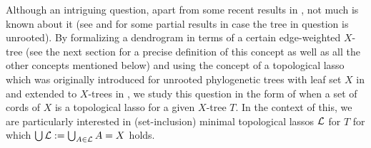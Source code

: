 Although an intriguing question, apart  from some recent results in \cite{HP13},
not much is known about it (see \cite{DHS11} and \cite{HS13}
for some partial results in case the tree in question is unrooted).
By formalizing a dendrogram in terms of a certain  edge-weighted
$X$-tree (see the next section for a precise definition
of this concept as well as all the other concepts
mentioned below) and using the concept of a
topological lasso which was originally introduced 
for unrooted phylogenetic trees with leaf set $X$
in \cite{DHS11} 
and extended to $X$-trees in \cite {HP13}, we study this question in
the form of when a set of cords of $X$  is a topological
lasso for a given $X$-tree $T$. In the context of this,
we are particularly interested in (set-inclusion) minimal topological
lassos ${\mathcal L}$ for $T$ for which $
\bigcup {\mathcal L}:=\bigcup_{A\in{\mathcal L}} A=X$ holds. 

